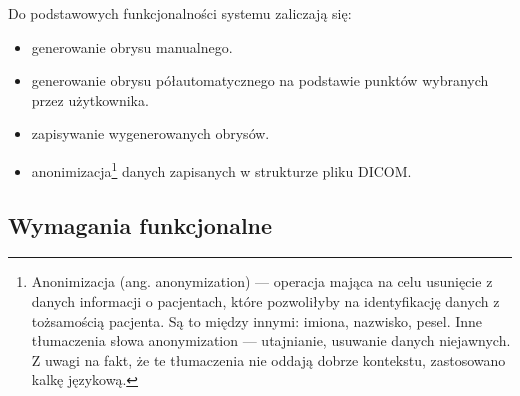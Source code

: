 \documentclass[a4paper,11pt,twoside,openright]{report}
\theoremstyle{definition}
\begin{document}
Do podstawowych funkcjonalności systemu zaliczają się:
\begin{itemize}[noitemsep]
\item generowanie obrysu manualnego.
\item generowanie obrysu półautomatycznego na podstawie punktów wybranych przez użytkownika.
\item zapisywanie wygenerowanych obrysów.
\item anonimizacja\footnote {Anonimizacja (ang. anonymization) --- operacja mająca
na celu usunięcie z danych informacji o pacjentach, które pozwoliłyby na identyfikację
danych z tożsamością pacjenta. Są to między innymi: imiona, nazwisko, pesel.
Inne tłumaczenia słowa anonymization --- utajnianie, usuwanie danych niejawnych.
Z uwagi na fakt, że te tłumaczenia nie oddają dobrze kontekstu, zastosowano kalkę
językową.} danych zapisanych w strukturze pliku DICOM.
\end{itemize}

\subsection {Wymagania funkcjonalne}
\end{document}
